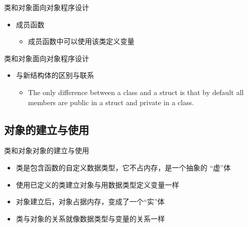 \begin{frame}[t, fragile]{类和对象}{面向对象程序设计}%
  \begin{itemize}
  \item 成员函数
    \begin{itemize}
    \item 成员函数中可以使用该类定义变量
    \end{itemize}
    \centering
    \vspace{2ex}
    \begin{minipage}{0.85\linewidth}
    \end{minipage}
  \end{itemize}  
\end{frame}

\begin{frame}[t, fragile]{类和对象}{面向对象程序设计}%
  \begin{spacing}{1.8}
    \begin{itemize}
    \item 与新结构体的区别与联系
      \begin{itemize}
      \item The only difference between a \alert{class} and a
        \alert{struct} is that by default all members are
        \alert{public} in a struct and \alert{private} in a class.
      \end{itemize}
    \end{itemize}
  \end{spacing}
\end{frame}

\subsection[对象]{对象的建立与使用}\label{sec:chap03-sec01-04}
\begin{frame}[t, fragile]{类和对象}{对象的建立与使用}%
  \stretchon
  \begin{itemize}
  \item 类是包含函数的自定义数据类型，它\alert{不占内存}，是一个抽象的
    \alert{``虚''体}
  \item 使用已定义的类建立对象与用数据类型定义变量一样
  \item 对象建立后，对象\alert{占据内存}，变成了一个\alert{``实''体}
  \item 类与对象的关系就像数据类型与变量的关系一样
  \end{itemize}
  \stretchoff
\end{frame}


